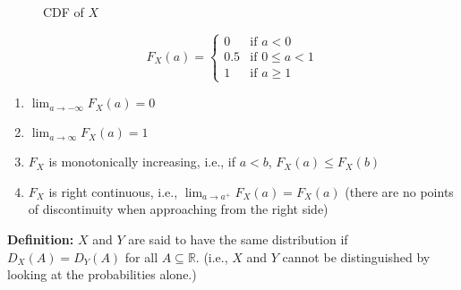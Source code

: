 \documentclass{article}
\begin{document}
    \begin{figure}[h!]
        \centering
        \caption{CDF of $X$}
        \label{fig:cdf-of-X}
    \end{figure}


    \[
        F_X(a) = 
        \begin{cases} 
            0 & \text{if } a < 0 \\
            0.5 & \text{if } 0 \leq a < 1 \\
            1 & \text{if } a \geq 1 
        \end{cases}
    \]

    \begin{enumerate}
        \item \(\lim_{a \to -\infty} F_X(a) = 0\)
        \item \(\lim_{a \to \infty} F_X(a) = 1\)
        \item \(F_X\) is monotonically increasing, i.e., if \(a < b\), \(F_X(a) \leq F_X(b)\)
        \item \(F_X\) is right continuous, i.e., \(\lim_{a \to a^+} F_X(a) = F_X(a)\) (there are no points of discontinuity when approaching from the right side)
    \end{enumerate}

    \textbf{Definition:} \(X\) and \(Y\) are said to have the same distribution if \(D_X(A) = D_Y(A)\) for all \(A \subseteq \mathbb{R}\). (i.e., \(X\) and \(Y\) cannot be distinguished by looking at the probabilities alone.)
\end{document}
